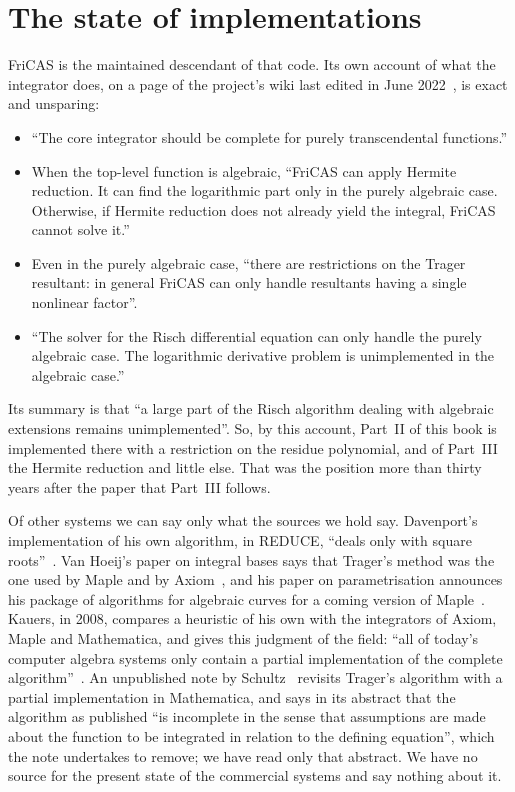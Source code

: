 \section{The state of implementations}\label{sec:impl-state}

FriCAS is the maintained descendant of that code. Its own account of what
the integrator does, on a page of the project's wiki last edited in June
2022~\cite{fricas2022}, is exact and unsparing:
\begin{itemize}
\item ``The core integrator should be complete for purely transcendental
  functions.''
\item When the top-level function is algebraic, ``FriCAS can apply Hermite
  reduction. It can find the logarithmic part only in the purely algebraic
  case. Otherwise, if Hermite reduction does not already yield the integral,
  FriCAS cannot solve it.''
\item Even in the purely algebraic case, ``there are restrictions on the
  Trager resultant: in general FriCAS can only handle resultants having a
  single nonlinear factor''.
\item ``The solver for the Risch differential equation can only handle the
  purely algebraic case. The logarithmic derivative problem is unimplemented
  in the algebraic case.''
\end{itemize}
Its summary is that ``a large part of the Risch algorithm dealing with
algebraic extensions remains unimplemented''. So, by this account, Part~II of this book is
implemented there with a restriction on the residue polynomial, and of
Part~III the Hermite reduction and little else. That was the position more
than thirty years after the paper that Part~III follows.

Of other systems we can say only what the sources we hold say.
Davenport's implementation of his own algorithm, in REDUCE, ``deals only
with square roots''~\cite{davenport1981}. Van Hoeij's paper on integral
bases says that Trager's method was the one used by Maple and by
Axiom~\cite{vanhoeij1994}, and his paper on parametrisation announces his
package of algorithms for algebraic curves for a coming version of
Maple~\cite{vanhoeij1997}. Kauers, in 2008, compares a heuristic of his own
with the integrators of Axiom, Maple and Mathematica, and gives this
judgment of the field: ``all of today's computer algebra systems only
contain a partial implementation of the complete
algorithm''~\cite{kauers2008}. An unpublished note by
Schultz~\cite{schultz2016} revisits Trager's algorithm with a partial
implementation in Mathematica, and says in its abstract that the algorithm
as published ``is incomplete in the sense that assumptions are made about the
function to be integrated in relation to the defining equation'', which the
note undertakes to remove; we have read only that abstract. We have no
source for the present state of the commercial systems and say nothing about
it.

